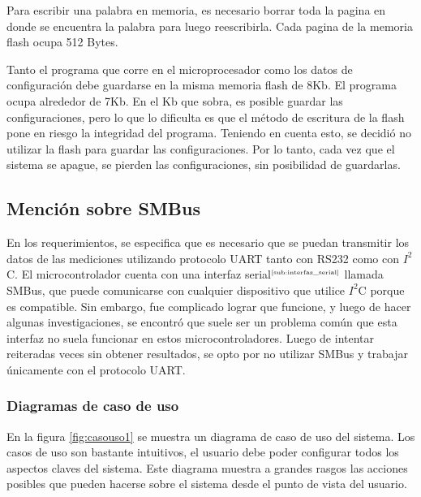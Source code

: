 Para escribir una palabra en memoria, es necesario borrar toda la pagina en donde se encuentra la palabra para luego reescribirla. Cada pagina de la memoria flash ocupa 512 Bytes.

Tanto el programa que corre en el microprocesador como los datos de configuraci\'on debe guardarse en la misma memoria flash de 8Kb. El programa ocupa alrededor de 7Kb. En el Kb que sobra, es posible guardar las configuraciones, pero lo que lo dificulta es que el m\'etodo de escritura de la flash pone en riesgo la integridad del programa. Teniendo en cuenta esto, se decidi\'o no utilizar la flash para guardar las configuraciones. Por lo tanto, cada vez que el sistema se apague, se pierden las configuraciones, sin posibilidad de guardarlas.


\subsection{Menci\'on sobre SMBus} %
\label{sub:mencion_sobre_smbus}

En los requerimientos, se especifica que es necesario que se puedan transmitir los datos de las mediciones utilizando protocolo UART tanto con RS232 como con $I^{2}$C. El microcontrolador cuenta con una interfaz serial$^{\tiny{\ref{sub:interfaz_serial}}}$ llamada SMBus, que puede comunicarse con cualquier dispositivo que utilice $I^{2}$C porque es compatible. Sin embargo, fue complicado lograr que funcione, y luego de hacer algunas investigaciones, se encontr\'o que suele ser un problema com\'un que esta interfaz no suela funcionar en estos microcontroladores. Luego de intentar reiteradas veces sin obtener resultados, se opto por no utilizar SMBus y trabajar \'unicamente con el protocolo UART.





\subsubsection{Diagramas de caso de uso} %
\label{ssub:diagramas_de_caso_de_uso}

En la figura \ref{fig:casouso1} se muestra un diagrama de caso de uso del sistema. Los casos de uso son bastante intuitivos, el usuario debe poder configurar todos los aspectos claves del sistema. Este diagrama muestra a grandes rasgos las acciones posibles que pueden hacerse sobre el sistema desde el punto de vista del usuario.

